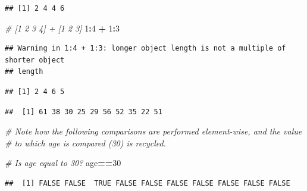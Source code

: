 \documentclass[
]{book}
\newenvironment{Shaded}{\begin{snugshade}}{\end{snugshade}}
\newcommand{\CommentTok}[1]{\textcolor[rgb]{0.56,0.35,0.01}{\textit{#1}}}
\newcommand{\DecValTok}[1]{\textcolor[rgb]{0.00,0.00,0.81}{#1}}
\newcommand{\NormalTok}[1]{#1}
\newcommand{\OtherTok}[1]{\textcolor[rgb]{0.56,0.35,0.01}{#1}}
\newcommand{\SpecialCharTok}[1]{\textcolor[rgb]{0.81,0.36,0.00}{\textbf{#1}}}
\begin{document}
\begin{verbatim}
## [1] 2 4 4 6
\end{verbatim}

\begin{Shaded}
\begin{Highlighting}[]
\CommentTok{\# [1 2 3 4] + [1 2 3]}
\DecValTok{1}\SpecialCharTok{:}\DecValTok{4} \SpecialCharTok{+} \DecValTok{1}\SpecialCharTok{:}\DecValTok{3}
\end{Highlighting}
\end{Shaded}

\begin{verbatim}
## Warning in 1:4 + 1:3: longer object length is not a multiple of shorter object
## length
\end{verbatim}

\begin{verbatim}
## [1] 2 4 6 5
\end{verbatim}

\begin{Shaded}
\end{Shaded}

\begin{verbatim}
##  [1] 61 38 30 25 29 56 52 35 22 51
\end{verbatim}

\begin{Shaded}
\begin{Highlighting}[]
\CommentTok{\# Note how the following comparisons are performed element{-}wise, and the value}
\CommentTok{\# to which age is compared (30) is recycled.}

\CommentTok{\# Is age equal to 30?}
\NormalTok{age}\SpecialCharTok{==}\DecValTok{30}
\end{Highlighting}
\end{Shaded}

\begin{verbatim}
##  [1] FALSE FALSE  TRUE FALSE FALSE FALSE FALSE FALSE FALSE FALSE
\end{verbatim}
\end{document}
